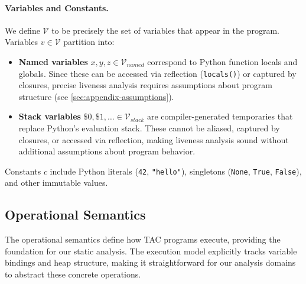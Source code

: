 \paragraph{Variables and Constants.}
We define $\mathcal{V}$ to be precisely the set of variables that appear in the program. Variables $v \in \mathcal{V}$ partition into:
\begin{itemize}
    \item \textbf{Named variables} $x,y,z \in \mathcal{V}_{\mathit{named}}$ correspond to Python function locals and globals. Since these can be accessed via reflection (\texttt{locals()}) or captured by closures, precise liveness analysis requires assumptions about program structure (see \autoref{sec:appendix-assumptions}).
    \item \textbf{Stack variables} $\mathsf{\$}0,\mathsf{\$}1,\ldots \in \mathcal{V}_{\mathit{stack}}$ are compiler-generated temporaries that replace Python's evaluation stack. These cannot be aliased, captured by closures, or accessed via reflection, making liveness analysis sound without additional assumptions about program behavior.
\end{itemize}
Constants $c$ include Python literals (\texttt{42}, \texttt{"hello"}), singletons (\texttt{None}, \texttt{True}, \texttt{False}), and other immutable values.

\subsection{Operational Semantics}
The operational semantics define how TAC programs execute, providing the foundation for our static analysis. The execution model explicitly tracks variable bindings and heap structure, making it straightforward for our analysis domains to abstract these concrete operations.

